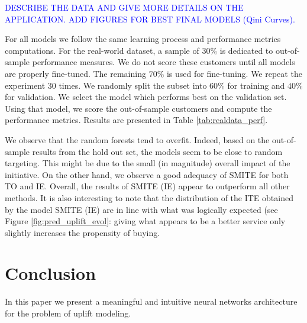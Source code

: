 \documentclass{article}
\begin{document}
\textcolor{blue}{DESCRIBE THE DATA AND GIVE MORE DETAILS ON THE APPLICATION. ADD FIGURES FOR BEST FINAL MODELS (Qini Curves).}

For all models we follow the same learning process and performance metrics computations. For the real-world dataset, a sample of $30\%$ is dedicated to out-of-sample performance measures. We do not score these customers until all models are properly fine-tuned. The remaining $70\%$ is used for fine-tuning. We repeat the experiment $30$ times. We randomly split the subset into $60\%$ for training and $40\%$ for validation. We select the model which performs best on the validation set. Using that model, we score the out-of-sample customers and compute the performance metrics. Results are presented in Table \ref{tab:realdata_perf}.



We observe that the random forests tend to overfit. Indeed, based on the out-of-sample results from the hold out set, the models seem to be close to random targeting. This might be due to the small (in magnitude) overall impact of the initiative. On the other hand, we observe a good adequacy of SMITE for both TO and IE. Overall, the results of SMITE (IE) appear to outperform all other methods. It is also interesting to note that the distribution of the ITE obtained by the model SMITE (IE) are in line with what was logically expected (see Figure \ref{fig:pred_uplift_evol}: giving what appears to be a better service only slightly increases the propensity of buying. 





\section{Conclusion}
\label{sec:conclusion}

In this paper we present a meaningful and intuitive neural networks architecture for the problem of uplift modeling. 

\end{document}
